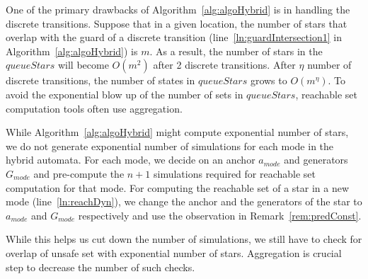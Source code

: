 One of the primary drawbacks of Algorithm~\ref{alg:algoHybrid} is in handling the discrete transitions. 
%
Suppose that in a given location, the number of stars that overlap with the guard of a discrete transition (line~\ref{ln:guardIntersection1} in Algorithm~\ref{alg:algoHybrid}) is $m$.
%
As a result, the number of stars in the $queueStars$ will become $O(m^2)$ after 2 discrete transitions. After $\eta$ number of discrete transitions, the number of states in $queueStars$ grows to $O(m^{\eta})$.
%
To avoid the exponential blow up of the number of sets in $queueStars$, reachable set computation tools often use aggregation.

\begin{remark}
\label{rem:hybridAlgo}
While Algorithm~\ref{alg:algoHybrid} might compute exponential number of stars, we do not generate exponential number of simulations for each mode in the hybrid automata. For each mode, we decide on an anchor $a_{mode}$ and generators $G_{mode}$ and pre-compute the $n+1$ simulations required for reachable set computation for that mode. For computing the reachable set of a star in a new mode (line~\ref{ln:reachDyn}), we change the anchor and the generators of the star to $a_{mode}$ and $G_{mode}$ respectively and use the observation in Remark~\ref{rem:predConst}. 

While this helps us cut down the number of simulations, we still have to check for overlap of unsafe set with exponential number of stars. Aggregation is crucial step to decrease the number of such checks.
\end{remark}


%
%
